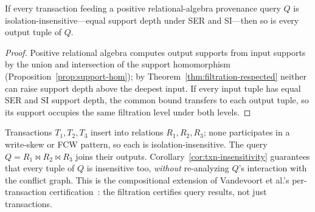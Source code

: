 \begin{corollary}
  \label{cor:txn-insensitivity}
  If every transaction feeding a positive relational-algebra provenance query
  $Q$ is isolation-insensitive---equal support depth under SER and SI---then so
  is every output tuple of $Q$.
\end{corollary}
\begin{proof}
  Positive relational algebra computes output supports from input supports by
  the union and intersection of the support homomorphism
  (Proposition~\ref{prop:support-hom}); by
  Theorem~\ref{thm:filtration-respected} neither can raise support depth above
  the deepest input. If every input tuple has equal SER and SI support depth,
  the common bound transfers to each output tuple, so its support occupies the
  same filtration level under both levels.
\end{proof}

\begin{example}
  \label{ex:txn-compose}
  Transactions $T_1,T_2,T_3$ insert into relations $R_1,R_2,R_3$; none
  participates in a write-skew or FCW pattern, so each is isolation-insensitive.
  The query $Q = R_1 \bowtie R_2 \bowtie R_3$ joins their outputs.
  Corollary~\ref{cor:txn-insensitivity} guarantees that every tuple of $Q$ is
  insensitive too, \emph{without} re-analyzing $Q$'s interaction with the
  conflict graph. This is the compositional extension of Vandevoort et al.'s
  per-transaction certification~\cite{vandevoort2025mixed}: the filtration
  certifies query results, not just transactions.
\end{example}

